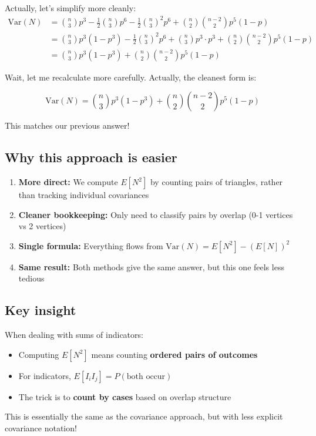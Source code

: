 \documentclass[11pt]{article}
\begin{document}
Actually, let's simplify more cleanly:
\begin{align*}
\text{Var}(N) &= \binom{n}{3} p^3 - \frac{1}{2}\binom{n}{3} p^6 - \frac{1}{2}\binom{n}{3}^2 p^6 + \binom{n}{2}\binom{n-2}{2} p^5(1-p) \\
&= \binom{n}{3} p^3(1 - p^3) - \frac{1}{2}\binom{n}{3}^2 p^6 + \binom{n}{3} p^3 \cdot p^3 + \binom{n}{2}\binom{n-2}{2} p^5(1-p) \\
&= \binom{n}{3} p^3(1-p^3) + \binom{n}{2}\binom{n-2}{2} p^5(1-p)
\end{align*}

Wait, let me recalculate more carefully. Actually, the cleanest form is:

\[
\boxed{\text{Var}(N) = \binom{n}{3} p^3(1-p^3) + \binom{n}{2}\binom{n-2}{2} p^5(1-p)}
\]

This matches our previous answer!

\subsection*{Why this approach is easier}

\begin{enumerate}[leftmargin=2em]
    \item \textbf{More direct:} We compute $E[N^2]$ by counting pairs of triangles, rather than tracking individual covariances

    \item \textbf{Cleaner bookkeeping:} Only need to classify pairs by overlap (0-1 vertices vs 2 vertices)

    \item \textbf{Single formula:} Everything flows from $\text{Var}(N) = E[N^2] - (E[N])^2$

    \item \textbf{Same result:} Both methods give the same answer, but this one feels less tedious
\end{enumerate}

\subsection*{Key insight}

When dealing with sums of indicators:
\begin{itemize}[leftmargin=2em]
    \item Computing $E[N^2]$ means counting \textbf{ordered pairs of outcomes}
    \item For indicators, $E[I_i I_j] = P(\text{both occur})$
    \item The trick is to \textbf{count by cases} based on overlap structure
\end{itemize}

This is essentially the same as the covariance approach, but with less explicit covariance notation!
\end{document}
